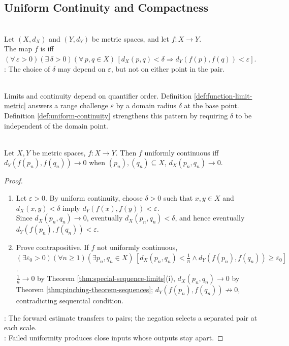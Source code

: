 \subsection{Uniform Continuity and Compactness}

\begin{definition} \label{def:uniform-continuity} \\
Let $(X,d_X)$ and $(Y,d_Y)$ be metric spaces, and let $f:X\to Y$.\\
The map $f$ is  iff $(\forall\,\varepsilon>0)(\exists\,\delta>0)(\forall\,p,q\in X)\,[d_X(p,q)<\delta\Longrightarrow d_Y(f(p),f(q))<\varepsilon]$.\\
: The choice of $\delta$ may depend on $\varepsilon$, but not on either point in the pair.
\end{definition}

\begin{principle} \label{princ:continuity-challenge-response} \\
Limits and continuity depend on quantifier order. Definition \ref{def:function-limit-metric} answers a range challenge $\varepsilon$ by a domain radius $\delta$ at the base point.\\
Definition \ref{def:uniform-continuity} strengthens this pattern by requiring $\delta$ to be independent of the domain point.
\end{principle}

\begin{proposition} \label{prop:uniform-continuity-sequential-test} \\
Let $X,Y$ be metric spaces, $f:X\to Y$. Then $f$ uniformly continuous iff $d_Y(f(p_n),f(q_n))\to0$ when $(p_n),(q_n)\subseteq X$, $d_X(p_n,q_n)\to0$.
\begin{proof}
\begin{enumerate}[label=\roman*.]
\setlength{\itemsep}{0pt}
\item[$(\Rightarrow)$] Let $\varepsilon>0$. By uniform continuity, choose $\delta>0$ such that $x,y\in X$ and $d_X(x,y)<\delta$ imply $d_Y(f(x),f(y))<\varepsilon$.\\
Since $d_X(p_n,q_n)\to0$, eventually $d_X(p_n,q_n)<\delta$, and hence eventually $d_Y(f(p_n),f(q_n))<\varepsilon$.
\item[$(\Leftarrow)$] Prove contrapositive. If $f$ not uniformly continuous, $(\exists\varepsilon_0>0)(\forall n\geq1)(\exists p_n,q_n\in X)\,[d_X(p_n,q_n)<\frac{1}{n}\land d_Y(f(p_n),f(q_n))\geq\varepsilon_0]$.\\
$\frac{1}{n}\to0$ by Theorem \ref{thm:special-sequence-limits}(i), $d_X(p_n,q_n)\to0$ by Theorem \ref{thm:pinching-theorem-sequences}; $d_Y(f(p_n),f(q_n))\not\to0$, contradicting sequential condition.
\end{enumerate}
: The forward estimate transfers to pairs; the negation selects a separated pair at each scale.\\
: Failed uniformity produces close inputs whose outputs stay apart.
\end{proof}
\end{proposition}


